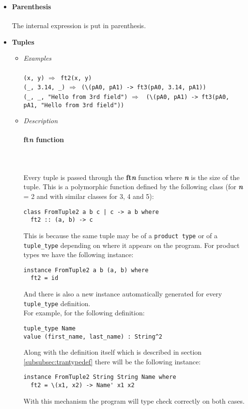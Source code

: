 \documentclass{article}
\def\lra{$\Longrightarrow$\ }
\def\pend{\mbox{}\\\\}
\begin{document}
\begin{itemize}
\item
\textbf{Parenthesis}\\\\
The internal expression is put in parenthesis.\\

\item
\textbf{Tuples}
\begin{itemize}
\item
\textit{Examples}\\\\
\texttt{(x, y)} \lra \texttt{ft2(x, y)} \\
\verb|(_, 3.14, _)| \lra \verb|(\(pA0, pA1) -> ft3(pA0, 3.14, pA1))|\\
\verb|(_, _, "Hello from 3rd field")| \lra
\verb|(\(pA0, pA1) -> ft3(pA0, pA1, "Hello from 3rd field"))|\\

\item
\textit{Description}
\paragraph{ft\textit{n} function}\pend
Every tuple is passed through the \textbf{ft\textit{n}} function where
\textbf{\textit{n}} is the size of the tuple. This is a polymorphic function
defined by the following class (for \textbf{\textit{n}} = 2 and with similar
classes for 3, 4 and 5):
\begin{verbatim}
class FromTuple2 a b c | c -> a b where
  ft2 :: (a, b) -> c
\end{verbatim}
This is because the same tuple may be of a \texttt{product type} or of a
\verb|tuple_type| depending on where it appears on the program.
For product types we have the following instance:
\begin{verbatim}
instance FromTuple2 a b (a, b) where
  ft2 = id
\end{verbatim}
And there is also a new instance automatically generated for every
\verb|tuple_type| definition.\\
For example, for the following definition:
\begin{verbatim}
tuple_type Name
value (first_name, last_name) : String^2
\end{verbatim}
Along with the definition itself which is described in section
\ref{subsubsec:trantypedef} there will be the following instance:
\begin{verbatim}
instance FromTuple2 String String Name where
  ft2 = \(x1, x2) -> Name' x1 x2
\end{verbatim}
With this mechanism the program will type check correctly on both cases.


\end{itemize}
\end{itemize}
\end{document}
